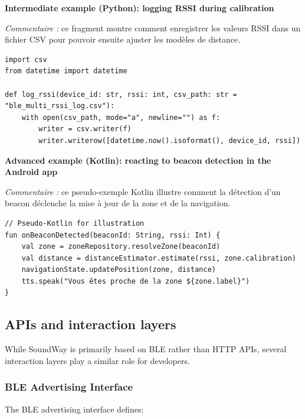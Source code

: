 \documentclass[12pt,a4paper]{article}
\begin{document}
\textbf{Intermediate example (Python): logging RSSI during calibration}

\vspace{0.5em}
\noindent\textit{Commentaire :} ce fragment montre comment enregistrer les valeurs RSSI dans un fichier CSV pour pouvoir ensuite ajuster les modèles de distance.

\lstset{language=Python,basicstyle=\ttfamily\scriptsize}
\begin{verbatim}
import csv
from datetime import datetime

def log_rssi(device_id: str, rssi: int, csv_path: str = "ble_multi_rssi_log.csv"):
    with open(csv_path, mode="a", newline="") as f:
        writer = csv.writer(f)
        writer.writerow([datetime.now().isoformat(), device_id, rssi])
\end{verbatim}
\normalsize

\textbf{Advanced example (Kotlin): reacting to beacon detection in the Android app}

\vspace{0.5em}
\noindent\textit{Commentaire :} ce pseudo-exemple Kotlin illustre comment la détection d’un beacon déclenche la mise à jour de la zone et de la navigation.

\lstset{language=Python,basicstyle=\ttfamily\scriptsize}
\begin{verbatim}
// Pseudo-Kotlin for illustration
fun onBeaconDetected(beaconId: String, rssi: Int) {
    val zone = zoneRepository.resolveZone(beaconId)
    val distance = distanceEstimator.estimate(rssi, zone.calibration)
    navigationState.updatePosition(zone, distance)
    tts.speak("Vous êtes proche de la zone ${zone.label}")
}
\end{verbatim}
\normalsize

\pagebreak

\subsection{APIs and interaction layers}

While SoundWay is primarily based on BLE rather than HTTP APIs, several interaction layers play a similar role for developers.

\subsubsection{BLE Advertising Interface}

The BLE advertising interface defines:
\end{document}
